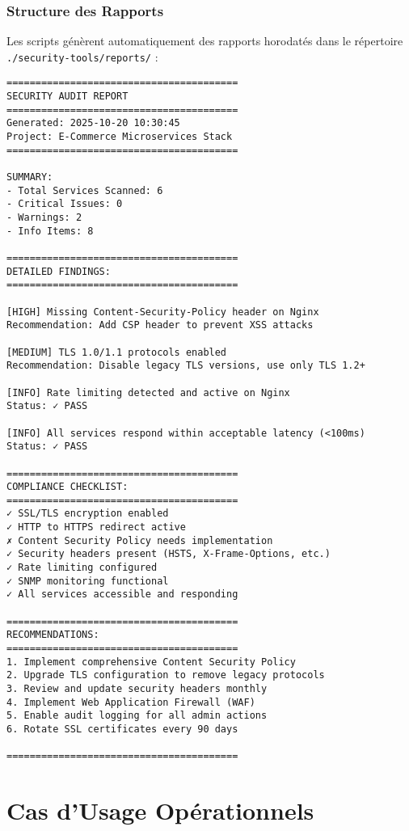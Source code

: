 \subsubsection{Structure des Rapports}
Les scripts génèrent automatiquement des rapports horodatés dans le répertoire \texttt{./security-tools/reports/} :

\begin{lstlisting}[caption=Structure d'un Rapport de Sécurité]
========================================
SECURITY AUDIT REPORT
========================================
Generated: 2025-10-20 10:30:45
Project: E-Commerce Microservices Stack
========================================

SUMMARY:
- Total Services Scanned: 6
- Critical Issues: 0
- Warnings: 2
- Info Items: 8

========================================
DETAILED FINDINGS:
========================================

[HIGH] Missing Content-Security-Policy header on Nginx
Recommendation: Add CSP header to prevent XSS attacks

[MEDIUM] TLS 1.0/1.1 protocols enabled
Recommendation: Disable legacy TLS versions, use only TLS 1.2+

[INFO] Rate limiting detected and active on Nginx
Status: ✓ PASS

[INFO] All services respond within acceptable latency (<100ms)
Status: ✓ PASS

========================================
COMPLIANCE CHECKLIST:
========================================
✓ SSL/TLS encryption enabled
✓ HTTP to HTTPS redirect active
✗ Content Security Policy needs implementation
✓ Security headers present (HSTS, X-Frame-Options, etc.)
✓ Rate limiting configured
✓ SNMP monitoring functional
✓ All services accessible and responding

========================================
RECOMMENDATIONS:
========================================
1. Implement comprehensive Content Security Policy
2. Upgrade TLS configuration to remove legacy protocols
3. Review and update security headers monthly
4. Implement Web Application Firewall (WAF)
5. Enable audit logging for all admin actions
6. Rotate SSL certificates every 90 days

========================================
\end{lstlisting}

\section{Cas d'Usage Opérationnels}

